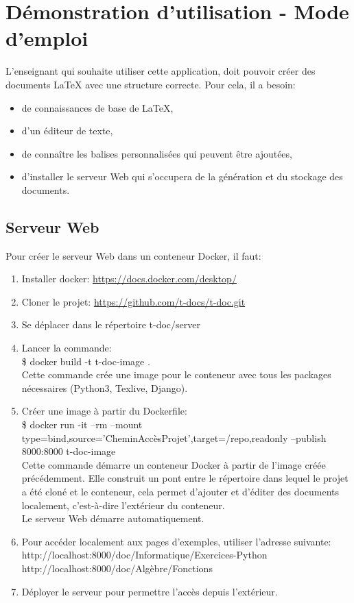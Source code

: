 \documentclass[12pt,titlepage,oneside]{article}
\renewcommand{\footnote}[1]{}
\begin{document}
\newpage

\section{Démonstration d'utilisation - Mode d'emploi}
L'enseignant qui souhaite utiliser cette application, doit pouvoir créer des documents LaTeX avec une structure correcte. Pour cela, il a besoin:
\begin{itemize}
\item de connaissances de base de LaTeX,
\item d'un éditeur de texte,
\item de connaître les balises personnalisées qui peuvent être ajoutées,
\item d'installer le serveur Web qui s'occupera de la génération et du stockage des documents.
\end{itemize}

\subsection{Serveur Web}
Pour créer le serveur Web dans un conteneur Docker\footnote{\url{https://docs.docker.com/}}, il faut:
\begin{enumerate}
  \item Installer docker: \url{https://docs.docker.com/desktop/}
  \item Cloner le projet: \url{https://github.com/t-docs/t-doc.git}
  \item Se déplacer dans le répertoire t-doc/server
  \item Lancer la commande:\\
  \$ docker build -t t-doc-image .\\
  Cette commande crée une image pour le conteneur avec tous les packages nécessaires (Python3, Texlive, Django).
  \item Créer une image à partir du Dockerfile:\\
  \$ docker run -it --rm --mount type=bind,source='CheminAccèsProjet',target=/repo,readonly --publish 8000:8000 t-doc-image\\
  Cette commande démarre un conteneur Docker à partir de l'image créée précédemment. Elle construit un pont entre le répertoire dans lequel le projet a été cloné et le conteneur, cela permet d'ajouter et d'éditer des documents localement, c'est-à-dire  l'extérieur du conteneur.\\
  Le serveur Web démarre automatiquement.
  \item Pour accéder localement aux pages d'exemples, utiliser l'adresse suivante:\\
  http://localhost:8000/doc/Informatique/Exercices-Python\\
  http://localhost:8000/doc/Algèbre/Fonctions
  \item Déployer le serveur pour permettre l'accès depuis l'extérieur.
\end{enumerate}
\end{document}
